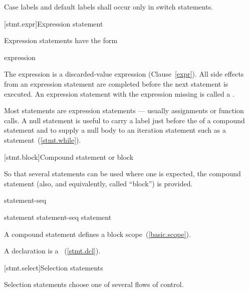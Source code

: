 \pnum
{}%
%
Case labels and default labels shall occur only in switch statements.


[stmt.expr]{Expression statement}%

\pnum
Expression statements have the form

\begin{bnf}
\br
    expression\opt{} \terminal{;}
\end{bnf}

The expression is
a discarded-value expression (Clause~\ref{expr}).
All
%
side effects from an expression statement
are completed before the next statement is executed.
%
%
An expression statement with the expression missing is called
a .
\begin{note}
Most statements are expression statements --- usually assignments or
function calls. A null statement is useful to carry a label just before
the \tcode{\}} of a compound statement and to supply a null body to an
iteration statement such as a 
statement~(\ref{stmt.while}).
\end{note}

[stmt.block]{Compound statement or block}%
%
%

\pnum
So that several statements can be used where one is expected, the
compound statement (also, and equivalently, called ``block'') is
provided.

\begin{bnf}
\br
    \terminal{\{} statement-seq\opt{} \terminal{\}}
\end{bnf}

\begin{bnf}
\br
    statement\br
    statement-seq statement
\end{bnf}

A compound statement defines a block scope~(\ref{basic.scope}).
\begin{note}
A declaration is a ~(\ref{stmt.dcl}).
\end{note}

[stmt.select]{Selection statements}%

\pnum
Selection statements choose one of several flows of control.

